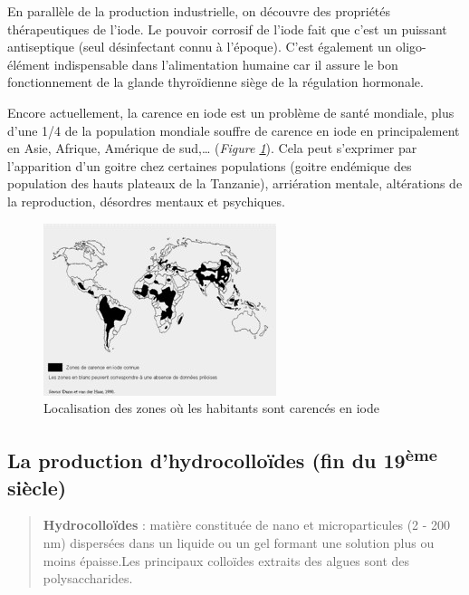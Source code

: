 \documentclass[
]{book}
\begin{document}
En parallèle de la production industrielle, on découvre des propriétés thérapeutiques de l'iode. Le pouvoir corrosif de l'iode fait que c'est un puissant antiseptique (seul désinfectant connu à l'époque). C'est également un oligo-élément indispensable dans l'alimentation humaine car il assure le bon fonctionnement de la glande thyroïdienne siège de la régulation hormonale.

Encore actuellement, la carence en iode est un problème de santé mondiale, plus d'une 1/4 de la population mondiale souffre de carence en iode en principalement en Asie, Afrique, Amérique de sud,\ldots{} (\emph{Figure \ref{fig:iode}}). Cela peut s'exprimer par l'apparition d'un goitre chez certaines populations (goitre endémique des population des hauts plateaux de la Tanzanie), arriération mentale, altérations de la reproduction, désordres mentaux et psychiques.

\begin{figure}

{\centering \includegraphics{images/iode} 

}

\caption{Localisation des zones où les habitants sont carencés en iode}\label{fig:iode}
\end{figure}

\hypertarget{la-production-dhydrocollouxefdes-fin-du-19uxe8me-siuxe8cle}{%
\subsection{\texorpdfstring{La production d'hydrocolloïdes (fin du 19\textsuperscript{ème} siècle)}{La production d'hydrocolloïdes (fin du 19ème siècle)}}\label{la-production-dhydrocollouxefdes-fin-du-19uxe8me-siuxe8cle}}

\begin{quote}
\textbf{Hydrocolloïdes} : matière constituée de nano et microparticules (2 - 200 nm) dispersées dans un liquide ou un gel formant une solution plus ou moins épaisse.Les principaux colloïdes extraits des algues sont des polysaccharides.
\end{quote}
\end{document}
